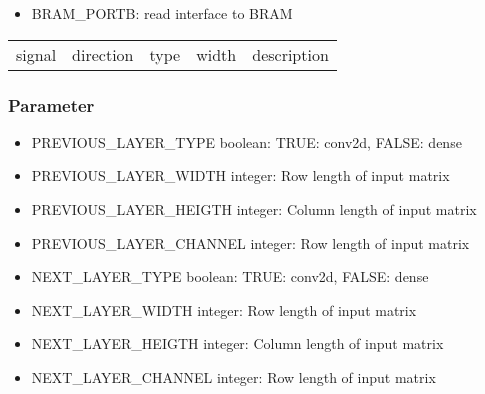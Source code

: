 \begin{itemize}
	\item BRAM\_PORTB: read interface to BRAM
\end{itemize}
\begin{tabular}{|l|l|l|l|l|}
	
	signal & direction & type & width & description\\
	
\end{tabular}

\subsubsection{Parameter}
\begin{itemize}
	\item PREVIOUS\_LAYER\_TYPE boolean: {TRUE: conv2d, FALSE: dense} %
	\item PREVIOUS\_LAYER\_WIDTH integer: {Row length of input matrix} 
	\item PREVIOUS\_LAYER\_HEIGTH integer: {Column length of input matrix}
	\item PREVIOUS\_LAYER\_CHANNEL integer: {Row length of input matrix}
	\item NEXT\_LAYER\_TYPE boolean: {TRUE: conv2d, FALSE: dense} %
	\item NEXT\_LAYER\_WIDTH integer: {Row length of input matrix} 
	\item NEXT\_LAYER\_HEIGTH integer: {Column length of input matrix}
	\item NEXT\_LAYER\_CHANNEL integer: {Row length of input matrix}
\end{itemize}

